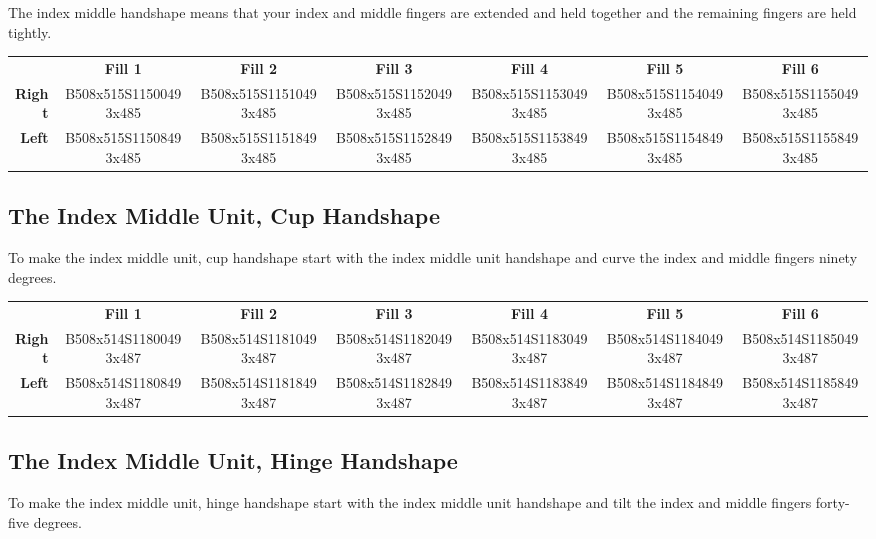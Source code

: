 \documentclass{article}
\begin{document}
The index middle handshape means that your index and middle fingers are extended and held together and the remaining fingers are held tightly.

\begin{center}
\begin{tabular}{r*{6}{c}}
&\textbf{Fill 1}&\textbf{Fill 2}&\textbf{Fill 3}&\textbf{Fill 4}&\textbf{Fill 5}&\textbf{Fill 6}\\
\textbf{Right}&
B508x515S11500493x485&
B508x515S11510493x485&
B508x515S11520493x485&
B508x515S11530493x485&
B508x515S11540493x485&
B508x515S11550493x485\\
\textbf{Left}&
B508x515S11508493x485&
B508x515S11518493x485&
B508x515S11528493x485&
B508x515S11538493x485&
B508x515S11548493x485&
B508x515S11558493x485\\
\end{tabular}
\end{center}

\subsection{The Index Middle Unit, Cup Handshape}

To make the index middle unit, cup handshape start with the index middle unit handshape and curve the index and middle fingers ninety degrees.

\begin{center}
\begin{tabular}{r*{6}{c}}
&\textbf{Fill 1}&\textbf{Fill 2}&\textbf{Fill 3}&\textbf{Fill 4}&\textbf{Fill 5}&\textbf{Fill 6}\\
\textbf{Right}&
B508x514S11800493x487&
B508x514S11810493x487&
B508x514S11820493x487&
B508x514S11830493x487&
B508x514S11840493x487&
B508x514S11850493x487\\
\textbf{Left}&
B508x514S11808493x487&
B508x514S11818493x487&
B508x514S11828493x487&
B508x514S11838493x487&
B508x514S11848493x487&
B508x514S11858493x487\\
\end{tabular}
\end{center}

\subsection{The Index Middle Unit, Hinge Handshape}

To make the index middle unit, hinge handshape start with the index middle unit handshape and tilt the index and middle fingers forty-five degrees.
\end{document}
